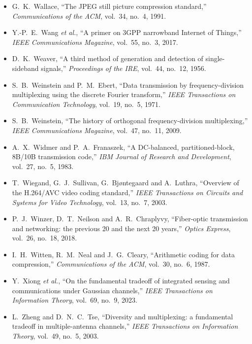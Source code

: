 \begin{itemize}[leftmargin=1.5em,itemindent=-1.5em,itemsep=1.5pt plus 1pt,parsep=0pt,topsep=4pt,label={}]
\item G.~K.~Wallace, ``The JPEG still picture compression standard,'' \emph{Communications of the ACM}, vol.~34, no.~4, 1991.
\item Y.-P.~E.~Wang \emph{et al.}, ``A primer on 3GPP narrowband Internet of Things,'' \emph{IEEE Communications Magazine}, vol.~55, no.~3, 2017.
\item D.~K.~Weaver, ``A third method of generation and detection of single-sideband signals,'' \emph{Proceedings of the IRE}, vol.~44, no.~12, 1956.
\item S.~B.~Weinstein and P.~M.~Ebert, ``Data transmission by frequency-division multiplexing using the discrete Fourier transform,'' \emph{IEEE Transactions on Communication Technology}, vol.~19, no.~5, 1971.
\item S.~B.~Weinstein, ``The history of orthogonal frequency-division multiplexing,'' \emph{IEEE Communications Magazine}, vol.~47, no.~11, 2009.
\item A.~X.~Widmer and P.~A.~Franaszek, ``A DC-balanced, partitioned-block, 8B/10B transmission code,'' \emph{IBM Journal of Research and Development}, vol.~27, no.~5, 1983.
\item T.~Wiegand, G.~J.~Sullivan, G.~Bj{\o}ntegaard and A.~Luthra, ``Overview of the H.264/AVC video coding standard,'' \emph{IEEE Transactions on Circuits and Systems for Video Technology}, vol.~13, no.~7, 2003.
\item P.~J.~Winzer, D.~T.~Neilson and A.~R.~Chraplyvy, ``Fiber-optic transmission and networking: the previous 20 and the next 20 years,'' \emph{Optics Express}, vol.~26, no.~18, 2018.
\item I.~H.~Witten, R.~M.~Neal and J.~G.~Cleary, ``Arithmetic coding for data compression,'' \emph{Communications of the ACM}, vol.~30, no.~6, 1987.
\item Y.~Xiong \emph{et al.}, ``On the fundamental tradeoff of integrated sensing and communications under Gaussian channels,'' \emph{IEEE Transactions on Information Theory}, vol.~69, no.~9, 2023.
\item L.~Zheng and D.~N.~C.~Tse, ``Diversity and multiplexing: a fundamental tradeoff in multiple-antenna channels,'' \emph{IEEE Transactions on Information Theory}, vol.~49, no.~5, 2003.
\end{itemize}
\endgroup

